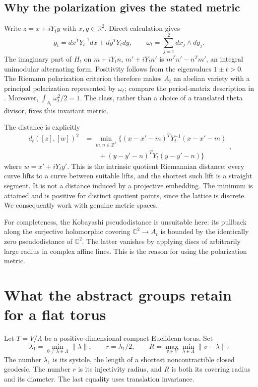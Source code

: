 \documentclass[12pt]{amsart}
\theoremstyle{definition}
\theoremstyle{remark}
\numberwithin{equation}{section}
\newcommand{\R}{\mathbb{R}}
\newcommand{\Z}{\mathbb{Z}}
\newcommand{\C}{\mathbb{C}}
\begin{document}
\subsection{Why the polarization gives the stated metric}
Write $z=x+iY_ty$ with $x,y\in\R^2$. Direct calculation gives
\begin{equation}\label{en:realmetric}
g_t=dx^TY_t^{-1}dx+dy^TY_tdy,\qquad
\omega_t=\sum_{j=1}^2dx_j\wedge dy_j.
\end{equation}
The imaginary part of $H_t$ on $m+iY_tn$, $m'+iY_tn'$ is
$m^Tn'-n^Tm'$, an integral unimodular alternating form. Positivity follows from the eigenvalues $1\pm t>0$. The Riemann polarization criterion therefore makes $A_t$ an abelian variety with a principal polarization represented by $\omega_t$; compare the period-matrix description in \cite[Lecture 5, p.~4; Lecture 7, pp.~1--3]{en:Schnell}. Moreover,
$\int_{A_t}\omega_t^2/2=1$. The class, rather than a choice of a translated theta divisor, fixes this invariant metric.

The distance is explicitly
\begin{equation}\label{en:distance}
\begin{aligned}
d_t([z],[w])^2&=\min_{m,n\in\Z^2}\bigl\{
(x-x'-m)^TY_t^{-1}(x-x'-m)\\
&\qquad +(y-y'-n)^TY_t(y-y'-n)\bigr\}
\end{aligned},
\end{equation}
where $w=x'+iY_ty'$. This is the intrinsic quotient Riemannian distance: every curve lifts to a curve between suitable lifts, and the shortest such lift is a straight segment. It is not a distance induced by a projective embedding. The minimum is attained and is positive for distinct quotient points, since the lattice is discrete. We consequently work with genuine metric spaces.

For completeness, the Kobayashi pseudodistance is unsuitable here: its pullback along the surjective holomorphic covering $\C^2\to A_t$ is bounded by the identically zero pseudodistance of $\C^2$. The latter vanishes by applying discs of arbitrarily large radius in complex affine lines. This is the reason for using the polarization metric.

\section{What the abstract groups retain for a flat torus}
Let $T=V/\Lambda$ be a positive-dimensional compact Euclidean torus. Set
\[
\lambda_1=\min_{0\ne\lambda\in\Lambda}\|\lambda\|,
\qquad r=\lambda_1/2,
\qquad R=\max_{v\in V}\min_{\lambda\in\Lambda}\|v-\lambda\|.
\]
The number $\lambda_1$ is its systole, the length of a shortest noncontractible closed geodesic. The number $r$ is its injectivity radius, and $R$ is both its covering radius and its diameter. The last equality uses translation invariance.
\end{document}
